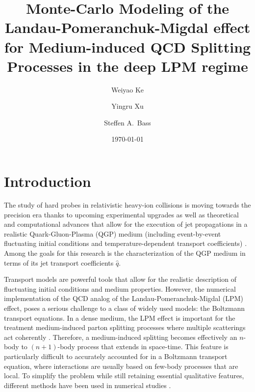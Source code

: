 \documentclass[aps, prc, reprint, amsmath, groupedaddress, nofootinbib]{revtex4-1}
\begin{document}
\title{Monte-Carlo Modeling of the Landau-Pomeranchuk-Migdal effect for Medium-induced QCD Splitting Processes in the deep LPM regime}
\author{Weiyao Ke}
\author{Yingru Xu}
\author{Steffen A.\ Bass}
\date{\today}
\maketitle 

\section{Introduction}
The study of hard probes in relativistic heavy-ion collisions is moving towards the precision era thanks to upcoming experimental upgrades \cite{ATLAS-Collaboration:2012iwa,Abelevetal:2014dna,STAR:upgrade-hf,Adare:2015kwa,CMS:2017dec} as well as theoretical and computational advances that allow for the execution of jet propagations in a realistic Quark-Gluon-Plasma (QGP) medium (including event-by-event fluctuating initial conditions and temperature-dependent transport coefficients) \cite{Wang:1994fx,Zakharov:1996fv,Baier:1996sk,Zakharov:1997uu,Arnold:2002zm,Gyulassy:2003mc,Kovner:2003zj,CasalderreySolana:2007pr,Djordjevic:2008iz,Bass:2008rv,Schenke:2009gb,Majumder:2009zu,Majumder:2010qh,Armesto:2011ht,Zapp:2011ya,Ovanesyan:2011xy,Kang:2014xsa,Cao:2016gvr,Kauder:2018cdt,Cao:2017zih}. Among the goals for this research is the characterization of the QGP medium in terms of its jet transport coefficients $\hat{q}$.

Transport models are powerful tools that allow for the realistic description of fluctuating initial conditions and medium properties. 
However, the numerical implementation of the QCD analog of the Landau-Pomeranchuk-Migdal (LPM) effect, poses a serious challenge to a class of widely used models: the Boltzmann transport equations. 
In a dense medium, the LPM effect is important for the treatment medium-induced parton splitting processes where multiple scatterings act coherently \cite{PhysRev.103.1811,Wang:1994fx,Zakharov:1996fv,Zakharov:1997uu,Baier:1996kr,Baier:1996sk}.
Therefore, a medium-induced splitting becomes effectively an $n$-body to $(n+1)$-body process that extends in space-time.
This feature is particularly difficult to accurately accounted for in a Boltzmann transport equation, where interactions are usually based on few-body processes that are local.
To simplify the problem while still retaining essential qualitative features, different methods have been used in numerical studies \cite{Cao:2013ita,ColemanSmith:2012vr,Xu:2004mz,Zapp:2011ya,Gossiaux:2012cv,Park:thesis}.
\end{document}
